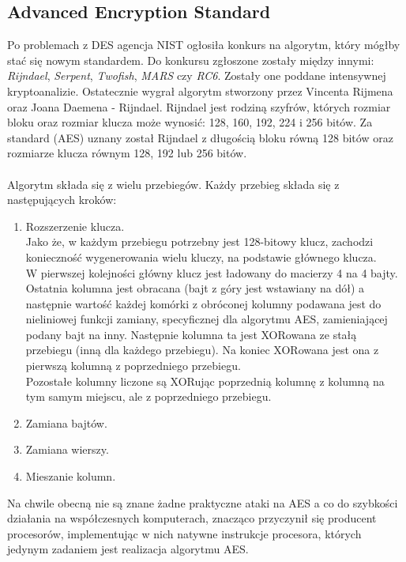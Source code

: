 \subsection{Advanced Encryption Standard}
Po problemach z DES agencja NIST ogłosiła konkurs na algorytm, który mógłby stać się nowym standardem.
Do konkursu zgłoszone zostały między innymi: \textit{Rijndael}, \textit{Serpent}, \textit{Twofish}, \textit{MARS} czy \textit{RC6}. 
Zostały one poddane intensywnej kryptoanalizie. 
Ostatecznie wygrał algorytm stworzony przez Vincenta Rijmena oraz Joana Daemena - Rijndael. 
Rijndael jest rodziną szyfrów, których rozmiar bloku oraz rozmiar klucza może wynosić: 128, 160, 192, 224 i 256 bitów. 
Za standard (AES) uznany został Rijndael z długością bloku równą 128 bitów oraz rozmiarze klucza równym 128, 192 lub 256 bitów. \\ \\
Algorytm składa się z wielu przebiegów. Każdy przebieg składa się z następujących kroków:
\begin{enumerate}
	\item Rozszerzenie klucza. \\
			Jako że, w każdym przebiegu potrzebny jest 128-bitowy klucz, zachodzi konieczność wygenerowania wielu kluczy, 
			na podstawie głównego klucza. \\
			W pierwszej kolejności główny klucz jest ładowany do macierzy 4 na 4 bajty. 
			Ostatnia kolumna jest obracana (bajt z góry jest wstawiany na dół) a następnie 
			wartość każdej komórki z obróconej kolumny podawana jest do nieliniowej funkcji zamiany, 
			specyficznej dla algorytmu AES, zamieniającej podany bajt na inny.
			Następnie kolumna ta jest XORowana ze stałą przebiegu (inną dla każdego przebiegu). 
			Na koniec XORowana jest ona z pierwszą kolumną z poprzedniego przebiegu. \\
			Pozostałe kolumny liczone są XORując poprzednią kolumnę z kolumną na tym samym miejscu, ale
			z poprzedniego przebiegu.
	\item Zamiana bajtów.
	\item Zamiana wierszy.
	\item Mieszanie kolumn.
\end{enumerate}
Na chwile obecną nie są znane żadne praktyczne ataki na AES a co do szybkości działania na współczesnych komputerach,
znacząco przyczynił się producent procesorów, implementując w nich natywne instrukcje procesora, których 
jedynym zadaniem jest realizacja algorytmu AES.


